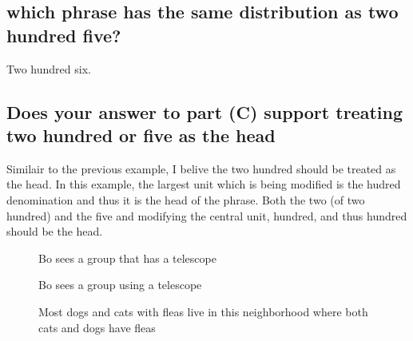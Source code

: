 \documentclass{article}
\begin{document}
\subsection{which phrase has the same distribution as two hundred five?}
Two hundred six.
\subsection{Does your answer to part (C) support treating two hundred or five as the head}
Similair to the previous example, I belive the two hundred should be treated as the head. In this example, the largest unit which is being modified is the hudred denomination and thus it is the head of the phrase. Both the two (of two hundred) and the five and modifying the central unit, hundred, and thus hundred should be the head.
\begin{figure}
 \centering
 \caption{Bo sees a group that has a telescope}
 \label{fig:1}
\end{figure}
\begin{figure}
 \centering
 \caption{Bo sees a group using a telescope}
 \label{fig:2}
\end{figure}
\begin{figure}
 \centering
 \caption{Most dogs and cats with fleas live in this neighborhood where both cats and dogs have fleas}
 \label{fig:3}
\end{figure}
\end{document}
